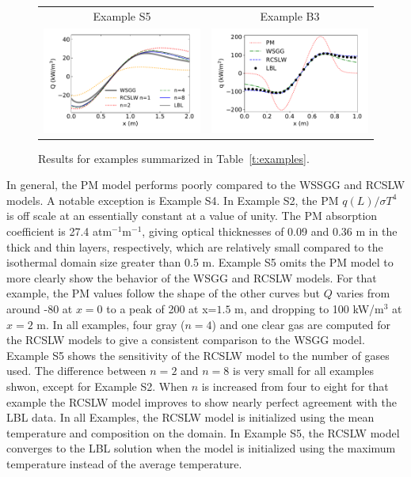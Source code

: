 \documentclass[preprint,12pt]{elsarticle}
\begin{document}
\begin{figure}
\begin{center}
\begin{tabular}{c c}
        Example S5 & Example B3 \\
        \includegraphics[width=2.75 in]{fig_ex_5b.pdf} &
        \includegraphics[width=2.75 in]{fig_ex_6.pdf}
    \end{tabular}
    \caption{Results for examples summarized in Table~\ref{t:examples}.}
    \label{f:examples}
    \end{center}
\end{figure}
%
In general, the PM model performs poorly compared to the WSSGG and RCSLW models. A notable exception is Example S4. In Example S2, the PM $q(L)/\sigma T^4$ is off scale at an essentially constant at a value of unity. The PM absorption coefficient is 27.4 atm$^{-1}$m$^{-1}$, giving optical thicknesses of 0.09 and 0.36 m in the thick and thin layers, respectively, which are relatively small compared to the isothermal domain size greater than 0.5 m. Example S5 omits the PM model to more clearly show the behavior of the WSGG and RCSLW models. For that example, the PM values follow the shape of the other curves but $Q$ varies from around -80 at $x=0$ to a peak of 200 at x=$1.5$ m, and dropping to 100 kW/m$^3$ at $x=2$ m. In all examples, four gray ($n=4$) and one clear gas are computed for the RCSLW models to give a consistent comparison to the WSGG model. Example S5 shows the sensitivity of the RCSLW model to the number of gases used. The difference between $n=2$ and $n=8$ is very small for all examples shwon, except for Example S2. When $n$ is increased from four to eight for that example the RCSLW model improves to show nearly perfect agreement with the LBL data.
In all Examples, the RCSLW model is initialized using the mean temperature and composition on the domain. In Example S5, the RCSLW model converges to the LBL solution when the model is initialized using the maximum temperature instead of the average temperature.
\end{document}

